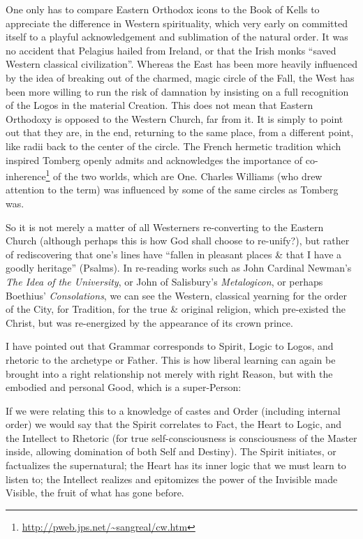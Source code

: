 One only has to compare Eastern Orthodox icons to the Book of Kells to appreciate the difference in Western spirituality, which very early on committed itself to a playful acknowledgement and sublimation of the natural order. It was no accident that Pelagius hailed from Ireland, or that the Irish monks ``saved Western classical civilization''. Whereas the East has been more heavily influenced by the idea of breaking out of the charmed, magic circle of the Fall, the West has been more willing to run the risk of damnation by insisting on a full recognition of the Logos in the material Creation. This does not mean that Eastern Orthodoxy is opposed to the Western Church, far from it. It is simply to point out that they are, in the end, returning to the same place, from a different point, like radii back to the center of the circle. The French hermetic tradition which inspired Tomberg openly admits and acknowledges the importance of co-inherence\footnote{\url{http://pweb.jps.net/~sangreal/cw.htm}} of the two worlds, which are One. Charles Williams (who drew attention to the term) was influenced by some of the same circles as Tomberg was.

So it is not merely a matter of all Westerners re-converting to the Eastern Church (although perhaps this is how God shall choose to re-unify?), but rather of rediscovering that one's lines have ``fallen in pleasant places \& that I have a goodly heritage'' (Psalms). In re-reading works such as John Cardinal Newman's \emph{The Idea of the University}, or John of Salisbury's \emph{Metalogicon}, or perhaps Boethius' \emph{Consolations}, we can see the Western, classical yearning for the order of the City, for Tradition, for the true \& original religion, which pre-existed the Christ, but was re-energized by the appearance of its crown prince.

I have pointed out that Grammar corresponds to Spirit, Logic to Logos, and rhetoric to the archetype or Father. This is how liberal learning can again be brought into a right relationship not merely with right Reason, but with the embodied and personal Good, which is a super-Person:

\begin{quotex}
If we were relating this to a knowledge of castes and Order (including internal order) we would say that the Spirit correlates to Fact, the Heart to Logic, and the Intellect to Rhetoric (for true self-consciousness is consciousness of the Master inside, allowing domination of both Self and Destiny). The Spirit initiates, or factualizes the supernatural; the Heart has its inner logic that we must learn to listen to; the Intellect realizes and epitomizes the power of the Invisible made Visible, the fruit of what has gone before.
\end{quotex}


